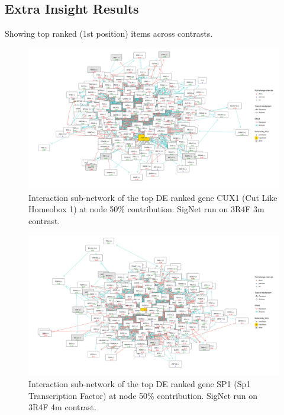 \subsection{Extra Insight Results}
\label{section:suppl:results}

Showing top ranked (1st position) items across contrasts.
\begin{figure}[!htbp]
    \centering
    \includegraphics[width=\textwidth, height=\textheight, keepaspectratio]{Major Thesis/figures/iut/graph/3R4F3m50-CUX1.png}
    \caption{Interaction sub-network of the top DE ranked gene CUX1 (Cut Like Homeobox 1) at node 50\% contribution. SigNet run on 3R4F 3m contrast.}
\end{figure}

\begin{figure}[!htbp]
    \centering
    \includegraphics[width=\textwidth, height=\textheight, keepaspectratio]{Major Thesis/figures/iut/graph/3R4F4m50-SP1.png}
    \caption{Interaction sub-network of the top DE ranked gene SP1 (Sp1 Transcription Factor) at node 50\% contribution. SigNet run on 3R4F 4m contrast.}
\end{figure}

